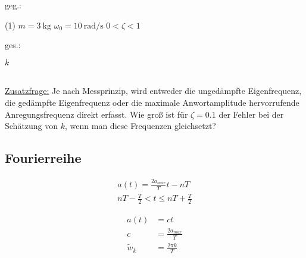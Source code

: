 \documentclass[12pt]{exam}
\begin{document}
\begin{questions}
     \begin{minipage}[t]{.49\linewidth}
        geg.:
        \begin{tasks}(1)
           \task[] $m = \SI{3}{\kilo\gram}$
           \task[] $\omega_0 = \SI{10}{\radian\per\second}$
           \task[] $0 < \zeta < 1$
        \end{tasks}
        \end{minipage}
        \begin{minipage}[t]{.49\linewidth}
        ges.:
        \begin{tasks}
            \task $k$
        \end{tasks}
        \end{minipage}\\
        \vspace{1cm}
        \underline{Zusatzfrage:} Je nach Messprinzip, wird entweder die ungedämpfte
Eigenfrequenz, die gedämpfte Eigenfrequenz oder die maximale Anwortamplitude
hervorrufende Anregungsfrequenz direkt erfasst. Wie groß ist für $\zeta = 0.1$ der
Fehler bei der Schätzung von $k$, wenn man diese Frequenzen gleichsetzt?



 \subsection{Fourierreihe}


\begin{minipage}[c]{.49\linewidth}
 \begin{align*}
     a(t) = \frac{2a_{max}}{T}t -nT \\
     nT - \frac{T}{2} < t \leq nT + \frac{T}{2}
 \end{align*}
 \end{minipage}
     \centering
     

\begin{solution}
\begin{minipage}[c]{.49\linewidth}
 \begin{align*}
     a(t) &= ct \\
     c &= \frac{2a_{max}}{T} \\
     \tilde{w}_k &= \frac{2\pi k}{T}
 \end{align*}
 \end{minipage}


\end{solution}
\end{questions}
\end{document}
